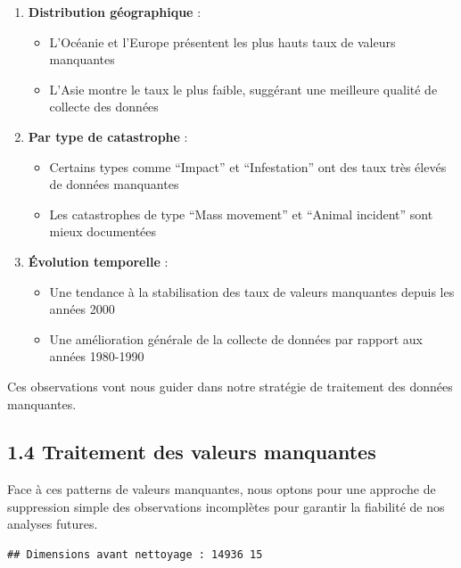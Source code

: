 \documentclass[
]{article}
\providecommand{\tightlist}{%
  \setlength{\itemsep}{0pt}\setlength{\parskip}{0pt}}
\begin{document}
\begin{enumerate}
\def\labelenumi{\arabic{enumi}.}
\tightlist
\item
  \textbf{Distribution géographique} :

  \begin{itemize}
  \tightlist
  \item
    L'Océanie et l'Europe présentent les plus hauts taux de valeurs
    manquantes
  \item
    L'Asie montre le taux le plus faible, suggérant une meilleure
    qualité de collecte des données
  \end{itemize}
\item
  \textbf{Par type de catastrophe} :

  \begin{itemize}
  \tightlist
  \item
    Certains types comme ``Impact'' et ``Infestation'' ont des taux très
    élevés de données manquantes
  \item
    Les catastrophes de type ``Mass movement'' et ``Animal incident''
    sont mieux documentées
  \end{itemize}
\item
  \textbf{Évolution temporelle} :

  \begin{itemize}
  \tightlist
  \item
    Une tendance à la stabilisation des taux de valeurs manquantes
    depuis les années 2000
  \item
    Une amélioration générale de la collecte de données par rapport aux
    années 1980-1990
  \end{itemize}
\end{enumerate}

Ces observations vont nous guider dans notre stratégie de traitement des
données manquantes.

\subsection{1.4 Traitement des valeurs
manquantes}\label{traitement-des-valeurs-manquantes}

Face à ces patterns de valeurs manquantes, nous optons pour une approche
de suppression simple des observations incomplètes pour garantir la
fiabilité de nos analyses futures.

\begin{verbatim}
## Dimensions avant nettoyage : 14936 15
\end{verbatim}
\end{document}

